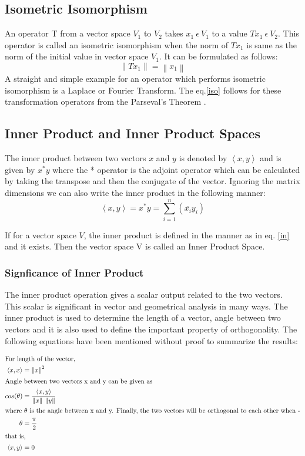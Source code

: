 \documentclass[a4paper,12pt]{article}
\newcommand\norm[1]{\left\lVert#1\right\rVert}
\begin{document}
	\subsection{Isometric Isomorphism}
	An operator T from a vector space $V_{1}$ to $V_{2}$ takes $x_{1} \:\epsilon\: V_{1}$ to a value $Tx_{1} \:\epsilon \:V_{2}$. This operator is called an isometric isomorphism when the norm of $Tx_{1}$ is same as the norm of the initial value in vector space $V_{1}$. It can be formulated as follows:
		\begin{equation}
			\norm{Tx_{1}} = \norm{x_{1}}
			\label{iso}
		\end{equation}
	A straight and simple example for an operator which performs isometric isomorphism is a Laplace or Fourier Transform. The eq.\ref{iso} follows for these transformation operators from the Parseval's Theorem \cite{parseval}.
	\subsection{Inner Product and Inner Product Spaces} The inner product between two vectors $x$ and $y$ is denoted by $\left\langle x, y \right\rangle$ and is given by $x^{*}y$ where the * operator is the adjoint operator which can be calculated by taking the transpose and then the conjugate of the vector. Ignoring the matrix dimensions we can also write the inner product in the following manner:
		\begin{equation}
			\left\langle x, y \right\rangle = x^{*}y = \sum\limits_{i=1}^n (\bar{x_{i}}y_{i})
			\label{in}
		\end{equation}
		
		If for a vector space $V$, the inner product is defined in the manner as in eq. \ref{in} and it exists. Then the vector space V is called an Inner Product Space.
		\subsubsection{Signficance of Inner Product}
			The inner product operation gives a scalar output related to the two vectors. This scalar is significant in vector and geometrical analysis in many ways. The inner product is used to determine the length of a vector, angle between two vectors and it is also used to define the important property of orthogonality. The following equations have been mentioned without proof to summarize the results:
			
			\begin{align}
				\intertext{For length of the vector,}
				\left\langle x, x \right\rangle &= \norm{x}^{2} \\
				\intertext{Angle between two vectors x and y can be given as}
				cos(\theta)&= \frac{\left\langle x, y \right\rangle}{\norm{x} \: \norm{y}} \\
				\intertext{where $\theta$ is the angle between x and y. Finally, the two vectors will be orthogonal to each other when -}
				\theta &= \frac{\pi}{2} \\
				\intertext{that is, }
				\left\langle x, y \right\rangle &= 0 
			\end{align}
			
\end{document}
